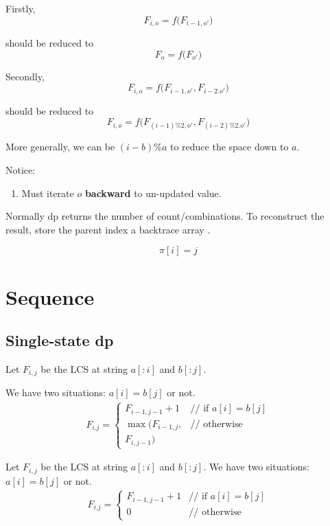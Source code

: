 Firstly,
$$
F_{i, o} = f\big(F_{i-1, o'}\big)
$$

should be reduced to 
$$
F_{o} = f\big(F_{o'}\big)
$$

Secondly,
$$
F_{i, o} = f\big(F_{i-1, o'}, F_{i-2. o'}\big)
$$

should be reduced to 
$$
F_{i, o} = f\big(F_{(i-1)\%2, o'}, F_{(i-2)\%2. o'}\big)
$$

More generally, we can be $(i-b)\%a$ to reduce the space down to $a$.

Notice:
\begin{enumerate}
\item Must iterate $o$ \textbf{backward} to un-updated value. 
\end{enumerate}

 Normally dp returns the number of count/combinations. To reconstruct the result, store the parent index a backtrace array . 

$$
\pi[i]=j
$$


\section{Sequence}\label{dpSequence}

\subsection{Single-state dp}
 Let $F_{i, j}$ be the LCS at string $a[:i]$ and $b[:j]$. 

We have two situations: $a[i]=b[j]$ or not.
\begin{eqnarray*}
F_{i. j} = \left\{ \begin{array}{rl}
  F_{i-1, j-1}+1 &\mbox{// if $a[i]=b[j]$} \\
  \max\Big(F_{i-1, j}, &\mbox{// otherwise} \\
  F_{i,j-1}\Big)
       \end{array} \right.
\end{eqnarray*}


 Let $F_{i, j}$ be the LCS at string $a[:i]$ and
$b[:j]$. We have two situations: $a[i]=b[j]$ or not.
\begin{eqnarray*}
F_{i. j} = \left\{ \begin{array}{rl}
  F_{i-1, j-1}+1 &\mbox{// if $a[i]=b[j]$} \\
  0 &\mbox{// otherwise}
       \end{array} \right.
\end{eqnarray*}

